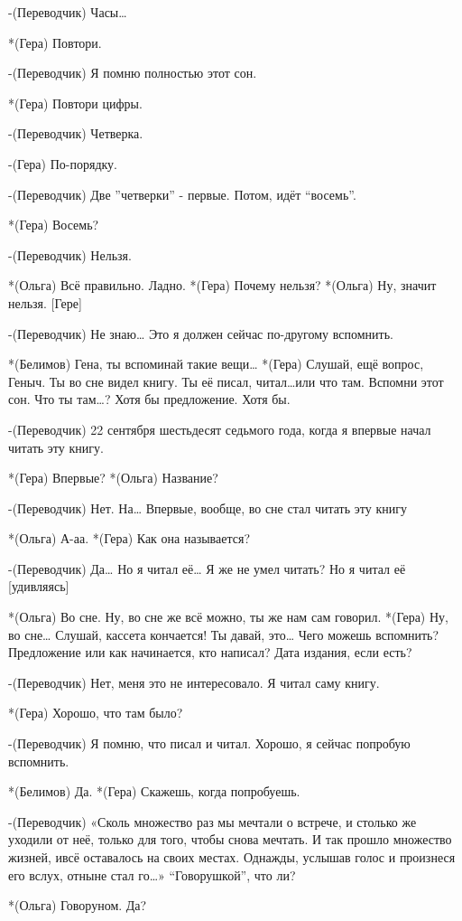 -(Переводчик) Часы… 

*(Гера) Повтори.

-(Переводчик) Я помню полностью этот сон.

*(Гера) Повтори цифры.

-(Переводчик) Четверка.

-(Гера) По-порядку.

-(Переводчик) Две ”четверки” - первые. Потом, идёт “восемь”.

*(Гера) Восемь?

-(Переводчик) Нельзя.

*(Ольга) Всё правильно. Ладно.
*(Гера) Почему нельзя?
*(Ольга) Ну, значит нельзя. [Гере]

-(Переводчик) Не знаю… Это я должен сейчас по-другому вспомнить.

*(Белимов) Гена, ты вспоминай такие вещи…
*(Гера) Слушай, ещё вопрос, Геныч. Ты во сне видел книгу. Ты её писал, читал…или что там. Вспомни этот сон. Что ты там…? Хотя бы предложение. Хотя бы.

-(Переводчик) 22 сентября шестьдесят седьмого года, когда я впервые начал читать эту книгу.

*(Гера) Впервые?
*(Ольга) Название?

-(Переводчик) Нет. На… Впервые, вообще, во сне стал читать эту книгу

*(Ольга) А-аа.
*(Гера) Как она называется?

-(Переводчик) Да… Но я читал её… Я же не умел читать? Но я читал её [удивляясь]

*(Ольга) Во сне. Ну, во сне же всё можно, ты же нам сам говорил.
*(Гера) Ну, во сне… Слушай, кассета кончается! Ты давай, это… Чего можешь вспомнить? Предложение или как начинается, кто написал? Дата издания, если есть?

-(Переводчик) Нет, меня это не интересовало. Я читал саму книгу.

*(Гера) Хорошо, что там было?

-(Переводчик) Я помню, что писал и читал. Хорошо, я сейчас попробую вспомнить.

*(Белимов) Да.
*(Гера) Скажешь, когда попробуешь.

-(Переводчик) «Сколь множество раз мы мечтали о встрече, и столько же  уходили от неё, только для того, чтобы снова мечтать. И так прошло множество жизней, ивсё оставалось на своих местах. Однажды, услышав голос и произнеся его вслух, отныне стал го…» “Говорушкой”, что ли?

*(Ольга) Говоруном. Да?

